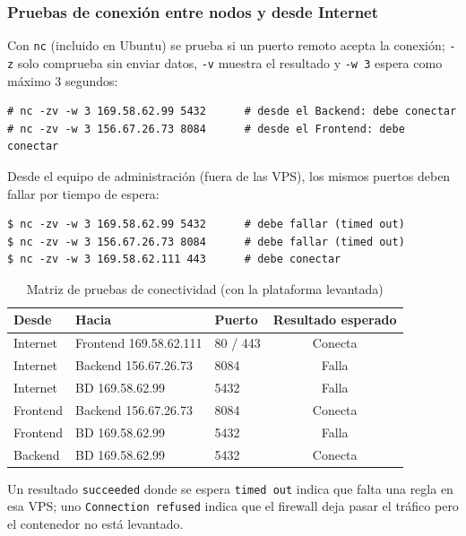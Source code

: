 \subsubsection{Pruebas de conexión entre nodos y desde Internet}
Con \texttt{nc} (incluido en Ubuntu) se prueba si un puerto remoto acepta la conexión; \texttt{-z} solo comprueba sin enviar datos, \texttt{-v} muestra el resultado y \texttt{-w 3} espera como máximo 3 segundos:
\begin{lstlisting}
# nc -zv -w 3 169.58.62.99 5432      # desde el Backend: debe conectar
# nc -zv -w 3 156.67.26.73 8084      # desde el Frontend: debe conectar
\end{lstlisting}
Desde el equipo de administración (fuera de las VPS), los mismos puertos deben fallar por tiempo de espera:
\begin{lstlisting}
$ nc -zv -w 3 169.58.62.99 5432      # debe fallar (timed out)
$ nc -zv -w 3 156.67.26.73 8084      # debe fallar (timed out)
$ nc -zv -w 3 169.58.62.111 443      # debe conectar
\end{lstlisting}

\begin{table}[H]
\centering
\caption{Matriz de pruebas de conectividad (con la plataforma levantada)}
\small
\begin{tabular}{lllc}
\toprule
\textbf{Desde} & \textbf{Hacia} & \textbf{Puerto} & \textbf{Resultado esperado} \\
\midrule
Internet & Frontend 169.58.62.111 & 80 / 443 & Conecta \\
Internet & Backend 156.67.26.73 & 8084 & Falla \\
Internet & BD 169.58.62.99 & 5432 & Falla \\
Frontend & Backend 156.67.26.73 & 8084 & Conecta \\
Frontend & BD 169.58.62.99 & 5432 & Falla \\
Backend & BD 169.58.62.99 & 5432 & Conecta \\
\bottomrule
\end{tabular}
\end{table}
Un resultado \texttt{succeeded} donde se espera \texttt{timed out} indica que falta una regla en esa VPS; uno \texttt{Connection refused} indica que el firewall deja pasar el tráfico pero el contenedor no está levantado.
